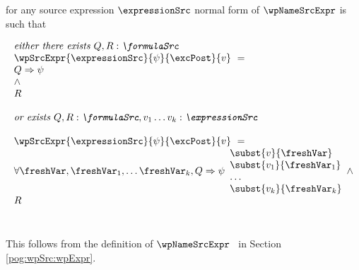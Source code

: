 \begin{wpExprSrc} \label{pogEq:aux:wpExprSrc}
for any source expression $\expressionSrc$ 
normal form of  $\wpNameSrcExpr$ is such that 

$$ \begin{array}{l}
         \mbox{\rm\textit{either  there exists $ Q,R:\formulaSrc $  }} \\
         \wpSrcExpr{\expressionSrc }{ \psi }{ \excPost}{v} \  = \\ 
          Q \Rightarrow \psi \\
          \wedge \\ 
	  R \\\\
	  \mbox{\rm\textit{or exists $ Q,R:\formulaSrc, v_1 \ldots v_k :\expressionSrc $   }} \\
\\
 \wpSrcExpr{\expressionSrc }{ \psi }{ \excPost}{v} \  = \\
      \forall \freshVar, \freshVar_1, \ldots  \freshVar_k   ,  Q \Rightarrow \psi 
                                                                             \begin{array}{l}
									         \subst{v}{ \freshVar}  \\
									        \subst{v_1 }{ \freshVar_1 }  \\
										\ldots \\
										\subst{v_k}{ \freshVar_k } 
									     \end{array}
          \wedge \\ 
	  R  
   \end{array}  $$ \\
\end{wpExprSrc}

This follows from the definition of $\wpNameSrcExpr$ \ in Section \ref{pog:wpSrc:wpExpr}.%



%



